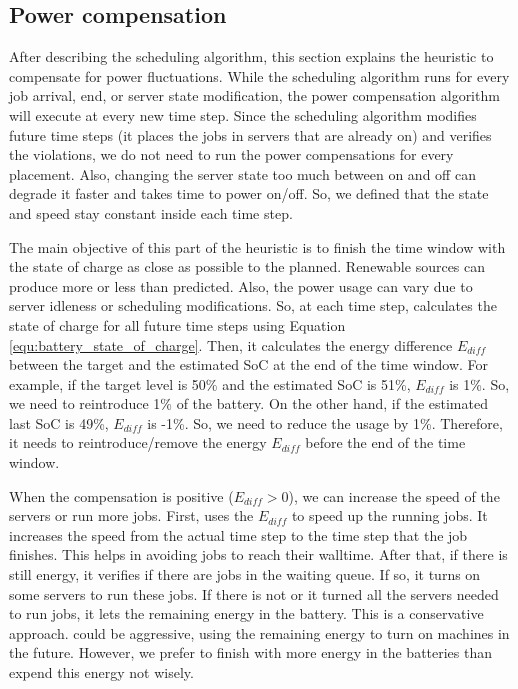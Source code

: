 \subsection{Power compensation}
\label{sec:model_compensations}

After describing the scheduling algorithm, this section explains the heuristic to compensate for power fluctuations. While the scheduling algorithm runs for every job arrival, end, or server state modification, the power compensation algorithm will execute at every new time step. Since the scheduling algorithm modifies future time steps (it places the jobs in servers that are already on) and verifies the violations, we do not need to run the power compensations for every placement. Also, changing the server state too much between on and off can degrade it faster and takes time to power on/off. So, we defined that the state and speed stay constant inside each time step. 

The main objective of this part of the heuristic is to finish the time window with the state of charge as close as possible to the planned. Renewable sources can produce more or less than predicted. Also, the power usage can vary due to server idleness or scheduling modifications. So, at each time step, \emph{\systemName} calculates the state of charge for all future time steps using Equation \ref{equ:battery_state_of_charge}. Then, it calculates the energy difference $E_{diff}$ between the target and the estimated SoC at the end of the time window. For example, if the target level is 50\% and the estimated SoC is 51\%, $E_{diff}$ is 1\%. So, we need to reintroduce 1\% of the battery. On the other hand, if the estimated last SoC is 49\%, $E_{diff}$ is -1\%. So, we need to reduce the usage by 1\%. Therefore, it needs to reintroduce/remove the energy $E_{diff}$ before the end of the time window.

When the compensation is positive ($E_{diff}>0$), we can increase the speed of the servers or run more jobs. First, \emph{\systemName} uses the $E_{diff}$ to speed up the running jobs. It increases the speed from the actual time step to the time step that the job finishes. This helps in avoiding jobs to reach their walltime. After that, if there is still energy, it verifies if there are jobs in the waiting queue. If so, it turns on some servers to run these jobs. If there is not or it turned all the servers needed to run jobs, it lets the remaining energy in the battery. This is a conservative approach. \emph{\systemName} could be aggressive, using the remaining energy to turn on machines in the future. However, we prefer to finish with more energy in the batteries than expend this energy not wisely.

